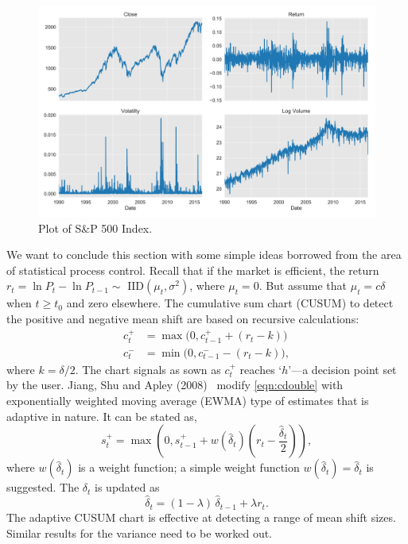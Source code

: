 	\begin{figure}[!ht]
	\centering
	\includegraphics[width=\textwidth]{chapters/chapter_advanced/figures/sp500.png}
	\caption{Plot of S\&P 500 Index. \label{fig:sp500}}
	\end{figure}
	

We want to conclude this section with some simple ideas borrowed from the area of statistical process control. Recall that if the market is efficient, the return $r_t= \ln P_t - \ln P_{t-1} \sim \text{ IID}(\mu_t, \sigma^2)$, where $\mu_t=0$. But assume that $\mu_t=c\delta$ when $t\geq t_0$ and zero elsewhere. The cumulative sum chart (CUSUM) to detect the positive and negative mean shift are based on recursive calculations:
	\begin{equation} \label{eqn:cdouble}
	\begin{aligned}
	c_t^+&= \max\big(0, c_{t-1}^+ + (r_t-k)\big) \\
	c_t^-&= \min\big(0, c_{t-1}^- - (r_t-k)\big),
	\end{aligned}
	\end{equation}
where $k= \delta/2$. The chart signals as sown as $c_t^+$ reaches `$h$'---a decision point set by the user. Jiang, Shu and Apley (2008)~\cite{shuap} modify \eqref{eqn:cdouble} with exponentially weighted moving average (EWMA) type of estimates that is adaptive in nature. It can be stated as,
	\begin{equation}\label{eqn:elma}
	s_t^+= \max \left( 0, s_{t-1}^+ + w(\hat{\delta}_t) \left(r_t - \frac{\hat{\delta}_t}{2} \right) \right),
	\end{equation}
where $w(\hat{\delta}_t)$ is a weight function; a simple weight function $w(\hat{\delta}_t)=\hat{\delta}_t$ is suggested. The $\delta_t$ is updated as 
	\begin{equation}\label{eqn:updatedelt}
	\hat{\delta}_t= (1-\lambda)\, \hat{\delta}_{t-1} + \lambda r_t.
	\end{equation}
The adaptive CUSUM chart is effective at detecting a range of mean shift sizes. Similar results for the variance need to be worked out.


